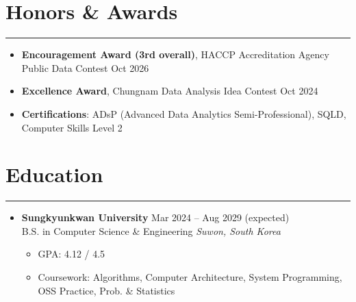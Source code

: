 \documentclass[letterpaper, 10pt]{article}
\begin{document}
\section*{Honors \& Awards}
\hrule
\vspace{4pt}
\begin{itemize}
    \item[] \textbf{Encouragement Award (3rd overall)}, HACCP Accreditation Agency Public Data Contest \hfill Oct 2026
    \item[] \textbf{Excellence Award}, Chungnam Data Analysis Idea Contest \hfill Oct 2024
    \item[] \textbf{Certifications}: ADsP (Advanced Data Analytics Semi-Professional), SQLD, Computer Skills Level 2
\end{itemize}

\section*{Education}
\hrule
\vspace{4pt}
\begin{itemize}
    \item[] \textbf{Sungkyunkwan University} \hfill Mar 2024 -- Aug 2029 (expected) \\
        B.S. in Computer Science \& Engineering \hfill \textit{Suwon, South Korea}
        \begin{itemize}
            \item GPA: 4.12 / 4.5
            \item Coursework: Algorithms, Computer Architecture, System Programming, OSS Practice, Prob. \& Statistics
        \end{itemize}
\end{itemize}

\end{document}
